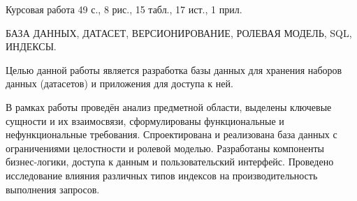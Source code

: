 Курсовая работа 49 с., 8 рис., 15 табл., 17 ист., 1 прил.

БАЗА ДАННЫХ, ДАТАСЕТ, ВЕРСИОНИРОВАНИЕ, РОЛЕВАЯ МОДЕЛЬ, SQL, ИНДЕКСЫ.

Целью данной работы является разработка базы данных для хранения наборов
данных (датасетов) и приложения для доступа к ней.

В рамках работы проведён анализ предметной области,
выделены ключевые сущности и их взаимосвязи,
сформулированы функциональные и нефункциональные требования.
Спроектирована и реализована база данных с ограничениями целостности и ролевой моделью.
Разработаны компоненты бизнес-логики, доступа к данным и пользовательский интерфейс.
Проведено исследование влияния различных типов индексов на производительность выполнения запросов.
